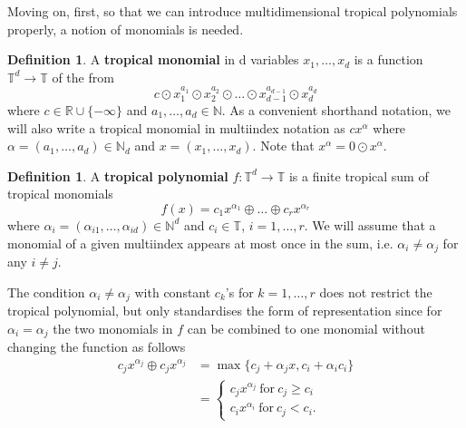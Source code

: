 \documentclass{article}
\theoremstyle{definition}
\newtheorem{definition}[theorem]{Definition}
\begin{document}
Moving on, first, so that we can introduce multidimensional tropical polynomials properly, a notion of monomials is needed.

\begin{definition}
\cite[p.~2]{zhang2018tropical}
A \textbf{tropical monomial} in d variables $x_1 , \dots , x_d$ is a function $ \mathbb{T}^{d} \to \mathbb{T} $ of the from 
$$ c \odot x_1^{a_1} \odot x_2^{a_2} \odot \dots \odot x_{d-1}^{a_{d-1}} \odot x_d^{a_d}$$
where $c \in \mathbb{R} \cup \{- \infty \}$ and $a_1, \dots , a_d \in \mathbb{N}$. As a convenient shorthand notation, we will also write a tropical monomial in multiindex notation as $cx^{\alpha}$ where $\alpha = (a_1 , \dots , a_d) \in \mathbb{N}_d$ and $x = (x_1 , \dots , x_d)$. Note that $x^{\alpha} = 0 \odot x^{\alpha}$.
\end{definition}

\begin{definition}\label{def:tropPolyn}
\cite[p.~2]{zhang2018tropical}
A \textbf{tropical polynomial} $f: \mathbb{T}^{d} \to \mathbb{T}$ is a finite tropical sum of tropical monomials 
$$ f(x)=c_1x^{\alpha_1} \oplus \dots \oplus c_rx^{\alpha_r}$$
where $\alpha_i = (\alpha_{i1}, \dots , \alpha_{id}) \in \mathbb{N}^{d}$ and $c_i \in \mathbb{T}$, $i = 1, \dots , r$. We will assume that a monomial of a given multiindex appears at most once in the sum, i.e. $\alpha_i \neq \alpha_j$ for any $i \neq j$.
\end{definition}

The condition $\alpha_i \neq \alpha_j$ with constant $c_{k}$'s for $k=1, \dots , r$ does not restrict the tropical polynomial, but only standardises the form of representation since for $\alpha_{i} = \alpha_{j}$ the two monomials in $f$ can be combined to one monomial without changing the function as follows 
\begin{align*}
c_jx^{\alpha_j} \oplus c_jx^{\alpha_j} 
&= \max \{ c_{j} + \alpha_{j} x , c_{i} + \alpha_{i} c_{i} \} \\
&= \begin{cases} c_{j} x^{\alpha_{j}} \ \text{for} \ c_{j} \geq c_{i}\\
c_{i} x^{\alpha_{i}} \ \text{for} \ c_{j} < c_{i}.
\end{cases}
\end{align*}
\end{document}
